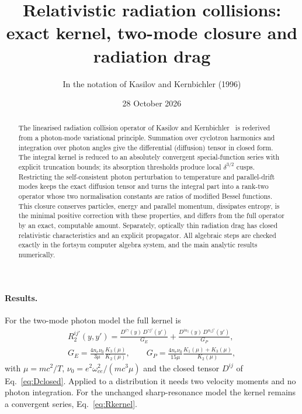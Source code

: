 \documentclass[11pt,a4paper]{article}
\title{Relativistic radiation collisions:\\exact kernel, two-mode closure and radiation drag}
\author{In the notation of Kasilov and Kernbichler (1996)}
\date{28 October 2026}
\numberwithin{equation}{section}
\newcommand{\upar}{u_\parallel}
\begin{document}
\maketitle

\begin{abstract}
The linearised radiation collision operator of Kasilov and Kernbichler~\cite{KK96}
is rederived from a photon-mode variational principle. Summation over cyclotron
harmonics and integration over photon angles give the differential (diffusion)
tensor in closed form. The integral kernel is reduced to an absolutely
convergent special-function series with explicit truncation bounds; its
absorption thresholds produce local $\delta^{3/2}$ cusps. Restricting the
self-consistent photon perturbation to temperature and parallel-drift modes
keeps the exact diffusion tensor and turns the integral part into a rank-two
operator whose two normalisation constants are ratios of modified Bessel
functions. This closure conserves particles, energy and parallel momentum,
dissipates entropy, is the minimal positive correction with these properties,
and differs from the full operator by an exact, computable amount. Separately,
optically thin radiation drag has closed relativistic characteristics and an
explicit propagator. All algebraic steps are checked exactly in the fortsym
computer algebra system, and the main analytic results numerically.
\end{abstract}

\paragraph{Results.}
For the two-mode photon model the full kernel is
\begin{equation}
\begin{gathered}
R_2^{ij'}(y,y')=\frac{D^{i\gamma}(y)\,D^{\gamma j'}(y')}{G_E}
+\frac{D^{i\upar}(y)\,D^{\upar j'}(y')}{G_P},\\
G_E=\frac{4n_e\nu_0}{3\mu}\frac{K_3(\mu)}{K_2(\mu)},\qquad
G_P=\frac{4n_e\nu_0}{15\mu}\frac{K_1(\mu)+K_3(\mu)}{K_2(\mu)},
\end{gathered}
\tag{R}\label{eq:result}
\end{equation}
with $\mu=mc^2/T$, $\nu_0=e^2\omega_{ce}^2/(mc^3\mu)$ and the closed tensor
$D^{ij}$ of Eq.~\eqref{eq:Dclosed}. Applied to a distribution it needs two
velocity moments and no photon integration. For the unchanged sharp-resonance
model the kernel remains a convergent series, Eq.~\eqref{eq:Rkernel}.

\tableofcontents
\end{document}
